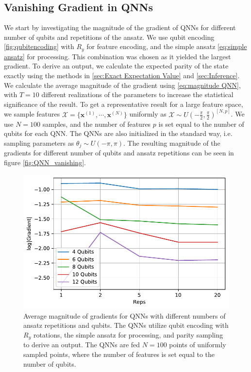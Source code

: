 \subsection{Vanishing Gradient in QNNs}\label{sec:Vanishing Gradient for QNNs}
We start by investigating the magnitude of the gradient of QNNs for different number of qubits and repetitions of the ansatz. We use qubit encoding \autoref{fig:qubitencoding} with $R_y$ for feature encoding, and the simple ansatz \autoref{eq:simple ansatz} for processing. This combination was chosen as it yielded the largest gradient. To derive an output, we calculate the expected parity of the state exactly using the methods in \autoref{sec:Exact Expectation Value} and \autoref{sec:Inference}. We calculate the average magnitude of the gradient using \autoref{eq:magnitude QNN}, with $T=10$ different realizations of the parameters to increase the statistical significance of the result. To get a representative result for a large feature space, we sample features $\mathcal{X} = \{\boldsymbol{x}^{(1)}, \cdots, \boldsymbol{x}^{(N)}\}$ uniformly as $\mathcal{X} \sim U(-\frac{\pi}{2}, \frac{\pi}{2})^{[N,p]}$. We use $N=100$ samples, and the number of features $p$ is set equal to the number of qubits for each QNN. The QNNs are also initialized in the standard way, i.e. sampling parameters as $\theta_j \sim U(-\pi, \pi)$. The resulting magnitude of the gradients for different number of qubits and ansatz repetitions can be seen in figure \autoref{fig:QNN_vanishing}.

\begin{figure}[H]
    \centering
    \includegraphics[width=12cm]{latex/figures/vanishing_gradient_QNN.pdf}
    \caption{Average magnitude of gradients for QNNs with different numbers of ansatz repetitions and qubits. The QNNs utilize qubit encoding with $R_y$ rotations, the simple ansatz for processing, and parity sampling to derive an output. The QNNs are fed $N=100$ points of uniformly sampled points, where the number of features is set equal to the number of qubits.}
    \label{fig:QNN_vanishing}
\end{figure}

